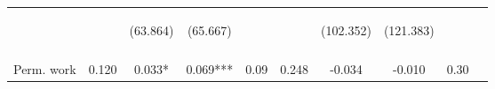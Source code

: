 \begin{table}[h!]
{\begin{tabular}{lccccccccc}
 & \begin{footnotesize}\end{footnotesize} & \begin{footnotesize}(63.864)\end{footnotesize} & \begin{footnotesize}(65.667)\end{footnotesize} & \begin{footnotesize}\end{footnotesize} & \begin{footnotesize}\end{footnotesize} & \begin{footnotesize}(102.352)\end{footnotesize} & \begin{footnotesize}(121.383)\end{footnotesize} & \begin{footnotesize}\end{footnotesize} & \begin{footnotesize}\end{footnotesize}\\
 & \begin{footnotesize}\end{footnotesize} & \begin{footnotesize}[0.437]\end{footnotesize} & \begin{footnotesize}[1.000]\end{footnotesize} & \begin{footnotesize}\end{footnotesize} & \begin{footnotesize}\end{footnotesize} & \begin{footnotesize}[0.753]\end{footnotesize} & \begin{footnotesize}[0.096]\end{footnotesize} & \begin{footnotesize}\end{footnotesize} & \begin{footnotesize}\end{footnotesize}\\
\noalign{\smallskip}Perm. work & 0.120 & 0.033* & 0.069*** & 0.09 & 0.248 & -0.034 & -0.010 & 0.30 & \\

\end{tabular}}
\end{table}
